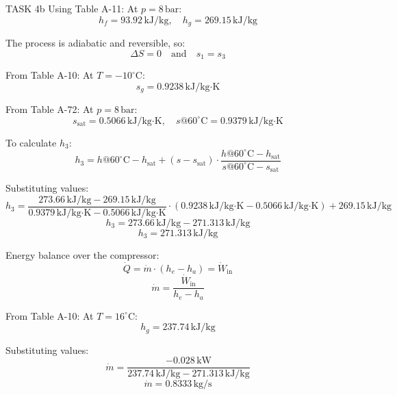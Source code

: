 TASK 4b  
Using Table A-11:  
At \( p = 8 \, \text{bar} \):  
\[
h_f = 93.92 \, \text{kJ/kg}, \quad h_g = 269.15 \, \text{kJ/kg}
\]  

The process is adiabatic and reversible, so:  
\[
\Delta S = 0 \quad \text{and} \quad s_1 = s_3
\]  

From Table A-10:  
At \( T = -10^\circ\text{C} \):  
\[
s_g = 0.9238 \, \text{kJ/kg·K}
\]  

From Table A-72:  
At \( p = 8 \, \text{bar} \):  
\[
s_{\text{sat}} = 0.5066 \, \text{kJ/kg·K}, \quad s@60^\circ\text{C} = 0.9379 \, \text{kJ/kg·K}
\]  

To calculate \( h_3 \):  
\[
h_3 = h@60^\circ\text{C} - h_{\text{sat}} + \left( s - s_{\text{sat}} \right) \cdot \frac{h@60^\circ\text{C} - h_{\text{sat}}}{s@60^\circ\text{C} - s_{\text{sat}}}
\]  

Substituting values:  
\[
h_3 = \frac{273.66 \, \text{kJ/kg} - 269.15 \, \text{kJ/kg}}{0.9379 \, \text{kJ/kg·K} - 0.5066 \, \text{kJ/kg·K}} \cdot \left( 0.9238 \, \text{kJ/kg·K} - 0.5066 \, \text{kJ/kg·K} \right) + 269.15 \, \text{kJ/kg}
\]  
\[
h_3 = 273.66 \, \text{kJ/kg} - 271.313 \, \text{kJ/kg}
\]  
\[
h_3 = 271.313 \, \text{kJ/kg}
\]  

Energy balance over the compressor:  
\[
\dot{Q} = \dot{m} \cdot (h_e - h_a) = \dot{W}_{\text{in}}
\]  
\[
\dot{m} = \frac{\dot{W}_{\text{in}}}{h_e - h_a}
\]  

From Table A-10:  
At \( T = 16^\circ\text{C} \):  
\[
h_g = 237.74 \, \text{kJ/kg}
\]  

Substituting values:  
\[
\dot{m} = \frac{-0.028 \, \text{kW}}{237.74 \, \text{kJ/kg} - 271.313 \, \text{kJ/kg}}
\]  
\[
\dot{m} = 0.8333 \, \text{kg/s}
\]
